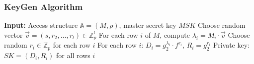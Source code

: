 \documentclass[11pt,a4paper]{article}
\begin{document}
\subsubsection{KeyGen Algorithm}

\begin{algorithm}
\caption{KP-ABE KeyGen}
\begin{algorithmic}
\STATE \textbf{Input:} Access structure $\mathbb{A} = (M, \rho)$, master secret key $MSK$
\STATE Choose random vector $\vec{v} = (s, r_2, \ldots, r_l) \in \mathbb{Z}_p^l$
\STATE For each row $i$ of $M$, compute $\lambda_i = M_i \cdot \vec{v}$
\STATE Choose random $r_i \in \mathbb{Z}_p$ for each row $i$
\STATE For each row $i$: $D_i = g_2^{\lambda_i} \cdot f^{r_i}$, $R_i = g_2^{r_i}$
\STATE Private key: $SK = (D_i, R_i)$ for all rows $i$
\end{algorithmic}
\end{algorithm}
\end{document}
